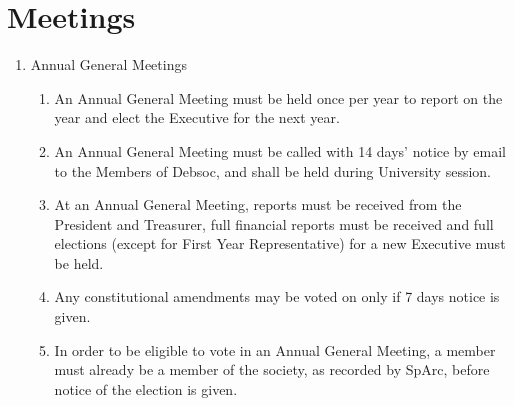\newpage
\section{Meetings}

\begin{enumerate}
\item Annual General Meetings
  \begin{enumerate}
  \item An Annual General Meeting must be held once per year to report on the year and elect the Executive for the next year.
  \item An Annual General Meeting must be called with 14 days’ notice by email to the Members of Debsoc, and shall be held during University session. \label{agm_notice_proc}
  \item At an Annual General Meeting, reports must be received from the President and Treasurer, full financial reports must be received and full elections (except for First Year Representative) for a new Executive must be held.
  \item Any constitutional amendments may be voted on only if 7 days notice is given.
  \item In order to be eligible to vote in an Annual General Meeting, a member must already be a member of the society, as recorded by SpArc, before notice of the election is given.
  \end{enumerate}


\end{enumerate}
